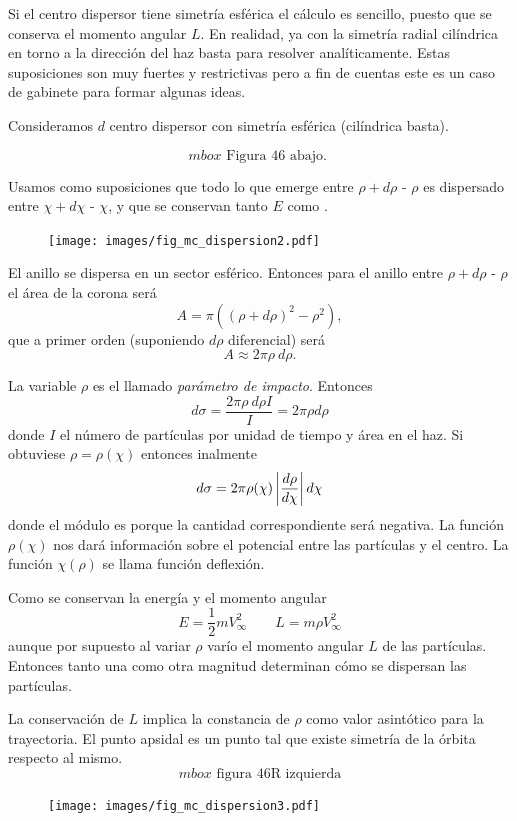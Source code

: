 \documentclass[10pt,oneside]{CBFT_book}
\begin{document}
Si el centro dispersor tiene simetría esférica el cálculo es sencillo, puesto que se conserva el 
momento angular $L$. En realidad, ya con la simetría radial cilíndrica en torno a la dirección del 
haz basta para resolver analíticamente.
Estas suposiciones son muy fuertes y restrictivas pero a fin de cuentas este es un caso de gabinete
para formar algunas ideas.

Consideramos $d$ centro dispersor con simetría esférica (cilíndrica basta).

\[
	mbox{ \text{ Figura 46 abajo. } }
\]

Usamos como suposiciones que todo lo que emerge entre $\rho + d\rho$ - $\rho$  es dispersado entre
$\chi + d\chi$ - $\chi$, y que se conservan tanto $E$ como .

\begin{figure}[htb]
	\begin{center}
	\texttt{[image: images/fig\_mc\_dispersion2.pdf]}	 
	\end{center}
	\caption{}
\end{figure}

El anillo se dispersa en un sector esférico. Entonces para el anillo entre $\rho + d\rho$ - $\rho$ el
área de la corona será
\[
	A =  \pi ( (\rho + d\rho)^2 - \rho^2 ),
\]
que a primer orden (suponiendo $d\rho$ diferencial) será 
\[
	A \approx 2 \pi \rho \: d\rho.
\]

La variable $\rho$ es el llamado {\it parámetro de impacto}. Entonces
\[
	d\sigma = \frac{  2 \pi \rho \: d\rho I}{I} = 2 \pi \rho d\rho
\]
donde $I$ el número de partículas por unidad de tiempo y área
en el haz. Si obtuviese $ \rho = \rho(\chi) $ entonces inalmente
\[
	d\sigma =  2 \pi \rho(\chi) \left| \frac{d^{\hspace{-0.05em}} {\rho}}{d {\chi}^{\hspace{-0.05em}}} \right| d\chi
\]
donde el módulo es porque la cantidad correspondiente será negativa. La función $\rho(\chi)$ nos dará
información sobre el potencial entre las partículas y el centro.
La función $\chi(\rho)$ se llama función deflexión.

Como se conservan la energía y el momento angular
\[
	E = \frac{1}{2} m V_\infty^2 \qquad L = m \rho V_\infty^2 
\]
aunque por supuesto al variar $\rho$ varío el momento angular $L$ de las partículas. Entonces tanto una
como otra magnitud determinan cómo se dispersan las partículas.

La conservación de $L$ implica la constancia de $\rho$ como valor asintótico para la trayectoria. El punto
apsidal es un punto tal que existe simetría de la órbita respecto al mismo.
\[
	mbox{ \text{ figura 46R izquierda} }
\]
\begin{figure}[htb]
	\begin{center}
	\texttt{[image: images/fig\_mc\_dispersion3.pdf]}	 
	\end{center}
	\caption{}
\end{figure}
\end{document}
